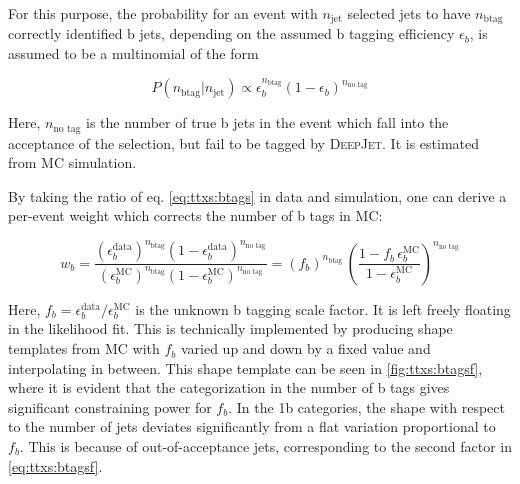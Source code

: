 For this purpose, the probability for an event with $n_{\mathrm{jet}}$ selected jets to have $n_{\mathrm{b tag}}$ correctly identified b jets, depending on the assumed b tagging efficiency $\epsilon_b$, is assumed to be a multinomial of the form

\begin{equation}
\label{eq:ttxs:btags}
    P (n_{\mathrm{b tag}} | n_{\mathrm{jet}}) \propto \epsilon_b^{n_{\mathrm{b tag}}} (1 - \epsilon_b)^{ n_{\text{no tag}}}
\end{equation}

Here, $n_{\text{no tag}}$ is the number of true b jets in the event which fall into the acceptance of the selection, but fail to be tagged by \textsc{DeepJet}. It is estimated from MC simulation. %

By taking the ratio of eq. \ref{eq:ttxs:btags} in data and simulation, one can derive a per-event weight which corrects the number of b tags in MC:

\begin{equation}
\label{eq:ttxs:btagsf}
    w_b = \frac
    {(\epsilon_b^{\mathrm{data}})^{n_{\mathrm{b tag}}} (1 - \epsilon_b^{\mathrm{data}})^{n_{\text{no tag}}}}
    {(\epsilon_b^{\mathrm{MC}})^{n_{\mathrm{b tag}}} (1 - \epsilon_b^{\mathrm{MC}})^{n_{\text{no tag}}}} 
    = (f_b)^{n_{\mathrm{b tag}}} \, \left( \frac{1 - f_b \, \epsilon_b^{\mathrm{MC}}}{1 - \epsilon_b^{\mathrm{MC}}} \right)^{n_{\text{no tag}}}
\end{equation}

Here, $f_b = \epsilon_b^{\mathrm{data}}/\epsilon_b^{\mathrm{MC}}$ is the unknown b tagging scale factor. It is left freely floating in the likelihood fit. This is technically implemented by producing shape templates from MC with $f_b$ varied up and down by a fixed value and interpolating in between. This shape template can be seen in \cref{fig:ttxs:btagsf}, where it is evident that the categorization in the number of b tags gives significant constraining power for $f_b$. In the 1b categories, the shape with respect to the number of jets deviates significantly from a flat variation proportional to $f_b$. This is because of out-of-acceptance jets, corresponding to the second factor in \cref{eq:ttxs:btagsf}.

